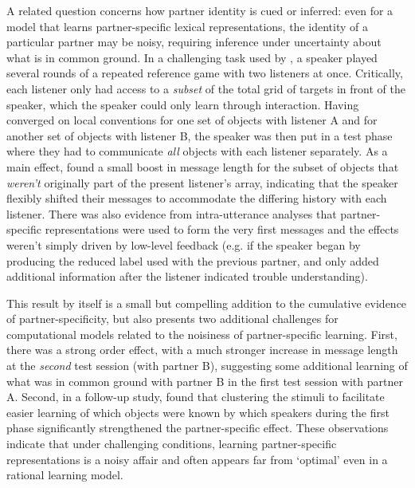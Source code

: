 A related question concerns how partner identity is cued or inferred: even for a model that learns partner-specific lexical representations, the identity of a particular partner may be noisy, requiring inference under uncertainty about what is in common ground. In a challenging task used by , a speaker played several rounds of a repeated reference game with two listeners at once. Critically, each listener only had access to a \emph{subset} of the total grid of targets in front of the speaker, which the speaker could only learn through interaction. Having converged on local conventions for one set of objects with listener A and for another set of objects with listener B, the speaker was then put in a test phase where they had to communicate \emph{all} objects with each listener separately. %
As a main effect,  found a small boost in message length for the subset of objects that \emph{weren't} originally part of the present listener's array, indicating that the speaker flexibly shifted their messages to accommodate the differing history with each listener. There was also evidence from intra-utterance analyses that partner-specific representations were used to form the very first messages and the effects weren't simply driven by low-level feedback (e.g. if the speaker began by producing the reduced label used with the previous partner, and only added additional information after the listener indicated trouble understanding). 

This result by itself is a small but compelling addition to the cumulative evidence of partner-specificity, but also presents two additional challenges for computational models related to the noisiness of partner-specific learning. First, there was a strong order effect, with a much stronger increase in message length at the \emph{second} test session (with partner B), suggesting some additional learning of what was in common ground with partner B in the first test session with partner A. Second, in a follow-up study,  found that clustering the stimuli to facilitate easier learning of which objects were known by which speakers during the first phase significantly strengthened the partner-specific effect. These observations indicate that under challenging conditions, learning partner-specific representations is a noisy affair and often appears far from `optimal' even in a rational learning model. 

